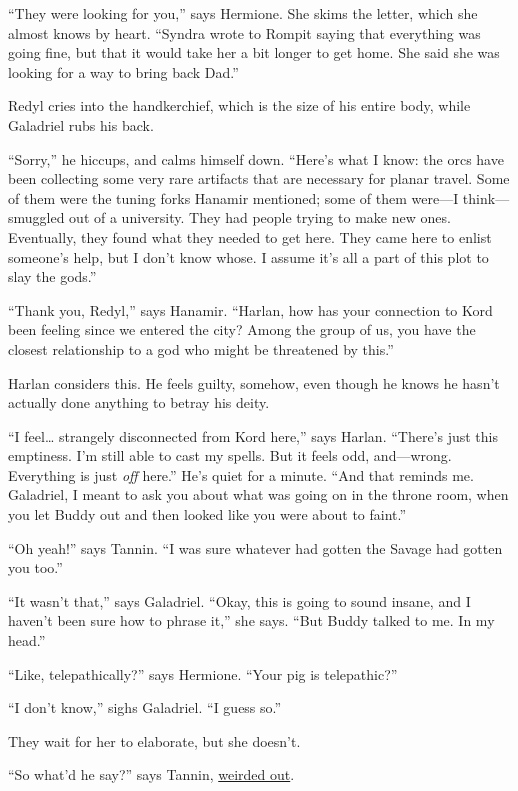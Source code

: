 \documentclass[smalldemyvopaper,11pt,twoside,onecolumn,openright,extrafontsizes]{memoir}
\begin{document}
``They were looking for you,'' says Hermione. She skims the letter,
which she almost knows by heart. ``Syndra wrote to Rompit saying that
everything was going fine, but that it would take her a bit longer to
get home. She said she was looking for a way to bring back Dad.''

Redyl cries into the handkerchief, which is the size of his entire body,
while Galadriel rubs his back.

``Sorry,'' he hiccups, and calms himself down. ``Here's what I know: the
orcs have been collecting some very rare artifacts that are necessary
for planar travel. Some of them were the tuning forks Hanamir mentioned;
some of them were---I think---smuggled out of a university. They had
people trying to make new ones. Eventually, they found what they needed
to get here. They came here to enlist someone's help, but I don't know
whose. I assume it's all a part of this plot to slay the gods.''

``Thank you, Redyl,'' says Hanamir. ``Harlan, how has your connection to
Kord been feeling since we entered the city? Among the group of us, you
have the closest relationship to a god who might be threatened by
this.''

Harlan considers this. He feels guilty, somehow, even though he knows he
hasn't actually done anything to betray his deity.

``I feel\ldots{} strangely disconnected from Kord here,'' says Harlan.
``There's just this emptiness. I'm still able to cast my spells. But it
feels odd, and---wrong. Everything is just \emph{off} here.'' He's quiet
for a minute. ``And that reminds me. Galadriel, I meant to ask you about
what was going on in the throne room, when you let Buddy out and then
looked like you were about to faint.''

``Oh yeah!'' says Tannin. ``I was sure whatever had gotten the Savage
had gotten you too.''

``It wasn't that,'' says Galadriel. ``Okay, this is going to sound
insane, and I haven't been sure how to phrase it,'' she says. ``But
Buddy talked to me. In my head.''

``Like, telepathically?'' says Hermione. ``Your pig is telepathic?''

``I don't know,'' sighs Galadriel. ``I guess so.''

They wait for her to elaborate, but she doesn't.

``So what'd he say?'' says Tannin,
\href{https://youtu.be/uV8TcpRQJCM?t=44s}{weirded out}.
\end{document}
